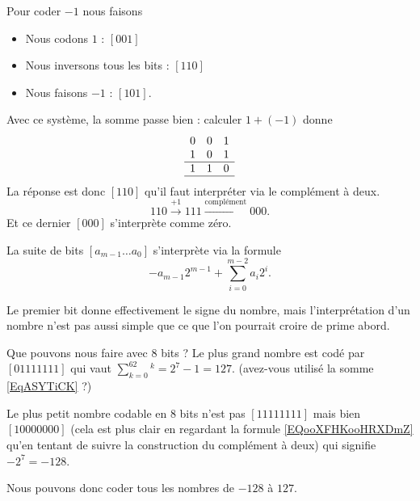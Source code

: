 \begin{example}
	Pour coder \( -1\) nous faisons
	\begin{itemize}
		\item Nous codons \( 1\) : \( [001]\)
		\item Nous inversons tous les bits : \( [110]\)
		\item Nous faisons \( -1\) : \( [101]\).
	\end{itemize}
\end{example}

Avec ce système, la somme passe bien : calculer \( 1+(-1)\) donne
\begin{equation*}
	\begin{array}[]{ccc}
		0 & 0 & 1 \\
		1 & 0 & 1 \\
		\hline
		1 & 1 & 0 \\
		\hline
	\end{array}
\end{equation*}
La réponse est donc \( [110]\) qu'il faut interpréter via le complément à deux.
\begin{equation}
	110\stackrel{+1}{\longrightarrow}111\stackrel{\text{complément}}{\longrightarrow}000.
\end{equation}
Et ce dernier \( [000]\) s'interprète comme zéro.

\begin{definition}
	La suite de bits \( [a_{m-1}\ldots a_0]\) s'interprète via la formule
	\begin{equation}        \label{EQooXFHKooHRXDmZ}
		-a_{m-1}2^{m-1}+\sum_{i=0}^{m-2}a_i2^i.
	\end{equation}
\end{definition}

Le premier bit donne effectivement le signe du nombre, mais l'interprétation d'un nombre n'est pas aussi simple que ce que l'on pourrait croire de prime abord.

\begin{example}
	Que pouvons nous faire avec \( 8\) bits ? Le plus grand nombre est codé par \( [01111111]\) qui vaut \( \sum_{k=0}^62^k=2^7-1=127\). (avez-vous utilisé la somme \eqref{EqASYTiCK} ?)

	Le plus petit nombre codable en \( 8\) bits n'est pas \( [11111111]\) mais bien \( [10000000]\) (cela est plus clair en regardant la formule \eqref{EQooXFHKooHRXDmZ} qu'en tentant de suivre la construction du complément à deux) qui signifie \( -2^7=-128\).

	Nous pouvons donc coder tous les nombres de \( -128\) à \( 127\).
\end{example}

